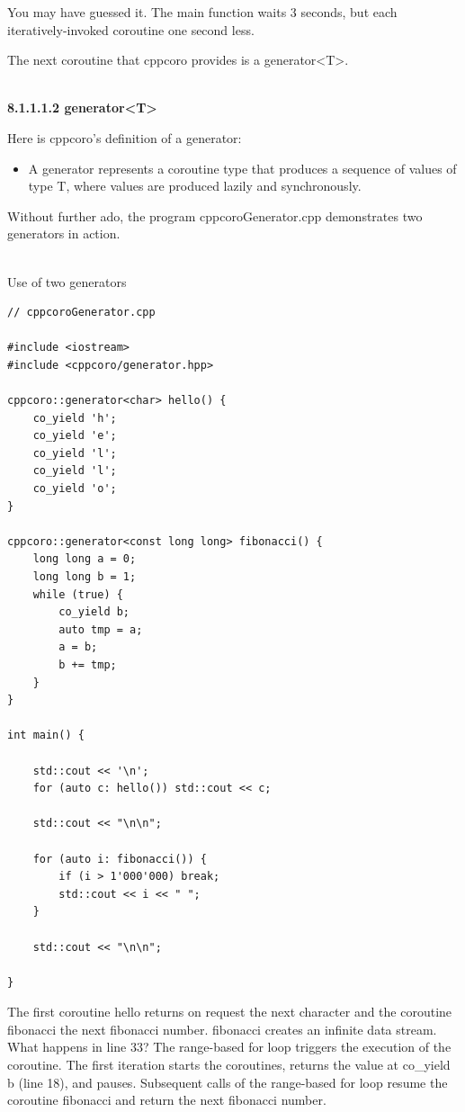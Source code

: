 You may have guessed it. The main function waits 3 seconds, but each iteratively-invoked coroutine one second less.

The next coroutine that cppcoro provides is a generator<T>.

\hspace*{\fill} \\ %
\noindent
\textbf{8.1.1.1.2\hspace{0.2cm} generator<T>}

Here is cppcoro’s definition of a generator:

\begin{itemize}
\item 
A generator represents a coroutine type that produces a sequence of values of type T, where values are produced lazily and synchronously.
\end{itemize}

Without further ado, the program cppcoroGenerator.cpp demonstrates two generators in action.

\hspace*{\fill} \\ %
\noindent
Use of two generators
\begin{lstlisting}[style=styleCXX]
// cppcoroGenerator.cpp

#include <iostream>
#include <cppcoro/generator.hpp>

cppcoro::generator<char> hello() {
	co_yield 'h';
	co_yield 'e';
	co_yield 'l';
	co_yield 'l';
	co_yield 'o';
}

cppcoro::generator<const long long> fibonacci() {
	long long a = 0;
	long long b = 1;
	while (true) {
		co_yield b;
		auto tmp = a;
		a = b;
		b += tmp;
	}
}

int main() {

	std::cout << '\n';
	for (auto c: hello()) std::cout << c;
	
	std::cout << "\n\n";
	
	for (auto i: fibonacci()) {
		if (i > 1'000'000) break;
		std::cout << i << " ";
	}
	
	std::cout << "\n\n";

}
\end{lstlisting}

The first coroutine hello returns on request the next character and the coroutine fibonacci the next fibonacci number. fibonacci creates an infinite data stream. What happens in line 33? The range-based for loop triggers the execution of the coroutine. The first iteration starts the coroutines, returns the value at co\_yield b (line 18), and pauses. Subsequent calls of the range-based for loop resume the coroutine fibonacci and return the next fibonacci number.

